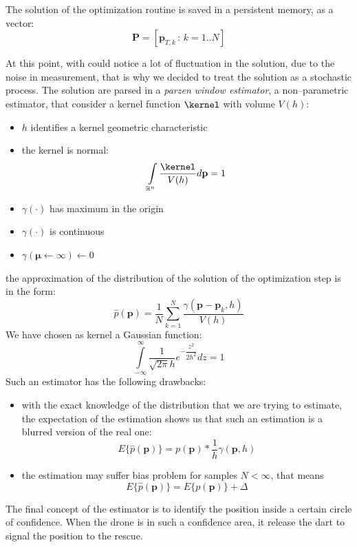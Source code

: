 The solution of the optimization routine is saved in a persistent memory, as a vector:
\[ \mathbf{P} = [ \mathbf{p}_{T,k} \,:\, k=1..N ] \]

At this point, with could notice a lot of fluctuation in the solution, due to the noise in measurement, that is why we decided to treat the solution as a stochastic process. The solution are parsed in a \emph{parzen window estimator}, a non--parametric estimator, that consider a kernel function $\kernel$ with volume $V(h)$:
\begin{itemize}
\item $h$ identifies a kernel geometric characteristic
\item the kernel is normal: 
\[ \int\limits_{\mathbb{R}^n} \dfrac{\kernel}{V(h)}d\mathbf{p} = 1 \]
\item $\gamma(\cdot)$ has maximum in the origin
\item $\gamma(\cdot)$ is continuous
\item $\gamma(\pmb{\mu}\leftarrow\infty)\leftarrow 0$
\end{itemize}
the approximation of the distribution of the solution of the optimization step is in the form:
\begin{equation}
\hat{p}(\mathbf{p}) = \dfrac{1}{N}\sum\limits_{k=1}^{N} \dfrac{\gamma(\mathbf{p}-\mathbf{p}_k,h)}{V(h)}
\end{equation}
We have chosen as kernel a Gaussian function: 
\[ \int\limits_{-\infty}^{\infty} \dfrac{1}{\sqrt{2\pi} h} e^{-\dfrac{z^2}{2 h^2}} dz = 1 \]
Such an estimator has the following drawbacks:
\begin{itemize}
\item with the exact knowledge of the distribution that we are trying to estimate, the expectation of the estimation shows us that such an estimation is a blurred version of the real one: \[{E\{\hat{p}(\mathbf{p})\} = p(\mathbf{p}) * \dfrac{1}{h} \gamma(\mathbf{p},h)}\]
\item the estimation may suffer bias problem for samples $N<\infty$, that means \[{E\{\hat{p}(\mathbf{p})\}=E\{{p}(\mathbf{p})\} + \Delta}\]
\end{itemize}

The final concept of the estimator is to identify the position inside a certain circle of confidence. When the drone is in such a confidence area, it release the dart to signal the position to the rescue.